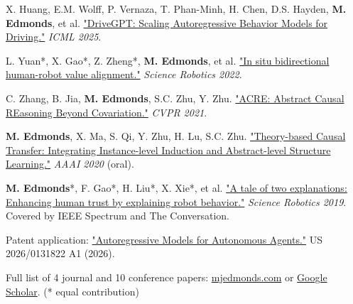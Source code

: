 

{\paragraphstyle %
\begin{cvitems}
  \item X. Huang, E.M. Wolff, P. Vernaza, T. Phan-Minh, H. Chen, D.S. Hayden, \textbf{M. Edmonds}, et al. \href{https://mjedmonds.com/papers/ICML25_DriveGPT.pdf}{"DriveGPT: Scaling Autoregressive Behavior Models for Driving."} \textit{ICML 2025}.
  \item L. Yuan*, X. Gao*, Z. Zheng*, \textbf{M. Edmonds}, et al. \href{https://www.science.org/doi/10.1126/scirobotics.abm4183}{"In situ bidirectional human-robot value alignment."} \textit{Science Robotics 2022}.
  \item C. Zhang, B. Jia, \textbf{M. Edmonds}, S.C. Zhu, Y. Zhu. \href{https://mjedmonds.com/papers/cvpr21zhang_acre.pdf}{"ACRE: Abstract Causal REasoning Beyond Covariation."} \textit{CVPR 2021}.
  \item \textbf{M. Edmonds}, X. Ma, S. Qi, Y. Zhu, H. Lu, S.C. Zhu. \href{https://mjedmonds.com/papers/AAAI20_OpenLockLearnerTransferRL_final.pdf}{"Theory-based Causal Transfer: Integrating Instance-level Induction and Abstract-level Structure Learning."} \textit{AAAI 2020} (oral).
  \item \textbf{M. Edmonds}*, F. Gao*, H. Liu*, X. Xie*, et al. \href{https://robotics.sciencemag.org/content/4/37/eaay4663}{"A tale of two explanations: Enhancing human trust by explaining robot behavior."} \textit{Science Robotics 2019}. Covered by IEEE Spectrum and The Conversation.
  \item Patent application: \href{https://mjedmonds.com/papers/US20260131822A1.pdf}{"Autoregressive Models for Autonomous Agents."} US 2026/0131822 A1 (2026).
  \item Full list of 4 journal and 10 conference papers: \href{https://mjedmonds.com/publications/}{mjedmonds.com} or \href{https://scholar.google.com/citations?user=ycAoqlAAAAAJ&hl=en}{Google Scholar}. \hfill {\publicationcontributionstyle (* equal contribution)}
\end{cvitems}
}
